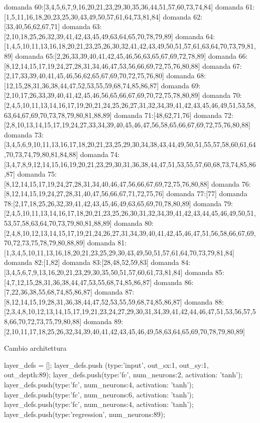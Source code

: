 domanda 60:[3,4,5,6,7,9,16,20,21,23,29,30,35,36,44,51,57,60,73,74,84]
domanda 61:[1,5,11,16,18,20,23,25,30,43,49,50,57,61,64,73,81,84]
domanda 62:[33,40,56,62,67,71]
domanda 63:[2,10,18,25,26,32,39,41,42,43,45,49,63,64,65,70,78,79,89]
domanda 64:[1,4,5,10,11,13,16,18,20,21,23,25,26,30,32,41,42,43,49,50,51,57,61,63,64,70,73,79,81,89]
domanda 65:[2,26,33,39,40,41,42,45,46,56,63,65,67,69,72,78,89]
domanda 66:[8,12,14,15,17,19,24,27,28,31,34,46,47,53,56,66,69,72,75,76,80,88]
domanda 67:[2,17,33,39,40,41,45,46,56,62,65,67,69,70,72,75,76,80]
domanda 68:[12,15,28,31,36,38,44,47,52,53,55,59,68,74,85,86,87]
domanda 69:[2,10,17,26,33,39,40,41,42,45,46,56,65,66,67,69,70,72,75,78,80,89]
domanda 70:[2,4,5,10,11,13,14,16,17,19,20,21,24,25,26,27,31,32,34,39,41,42,43,45,46,49,51,53,58,63,64,67,69,70,73,78,79,80,81,88,89]
domanda 71:[48,62,71,76]
domanda 72:[2,8,10,13,14,15,17,19,24,27,33,34,39,40,45,46,47,56,58,65,66,67,69,72,75,76,80,88]
domanda 73:[3,4,5,6,9,10,11,13,16,17,18,20,21,23,25,29,30,34,38,43,44,49,50,51,55,57,58,60,61,64,70,73,74,79,80,81,84,88]
domanda 74:[3,4,7,8,9,12,14,15,16,19,20,21,23,29,30,31,36,38,44,47,51,53,55,57,60,68,73,74,85,86,87]
domanda 75:[8,12,14,15,17,19,24,27,28,31,34,40,46,47,56,66,67,69,72,75,76,80,88]
domanda 76:[8,12,14,15,19,24,27,28,31,40,47,56,66,67,71,72,75,76]
domanda 77:[77]
domanda 78:[2,17,18,25,26,32,39,41,42,43,45,46,49,63,65,69,70,78,80,89]
domanda 79:[2,4,5,10,11,13,14,16,17,18,20,21,23,25,26,30,31,32,34,39,41,42,43,44,45,46,49,50,51,53,57,58,63,64,70,73,79,80,81,88,89]
domanda 80:[2,4,8,10,12,13,14,15,17,19,21,24,26,27,31,34,39,40,41,42,45,46,47,51,56,58,66,67,69,70,72,73,75,78,79,80,88,89]
domanda 81:[1,3,4,5,10,11,13,16,18,20,21,23,25,29,30,43,49,50,51,57,61,64,70,73,79,81,84]
domanda 82:[1,82]
domanda 83:[28,48,52,59,83]
domanda 84:[3,4,5,6,7,9,13,16,20,21,23,29,30,35,50,51,57,60,61,73,81,84]
domanda 85:[4,7,12,15,28,31,36,38,44,47,53,55,68,74,85,86,87]
domanda 86:[7,22,36,38,55,68,74,85,86,87]
domanda 87:[8,12,14,15,19,28,31,36,38,44,47,52,53,55,59,68,74,85,86,87]
domanda 88:[2,3,4,8,10,12,13,14,15,17,19,21,23,24,27,29,30,31,34,39,41,42,44,46,47,51,53,56,57,58,66,70,72,73,75,79,80,88]
domanda 89:[2,10,11,17,18,25,26,32,34,39,40,41,42,43,45,46,49,58,63,64,65,69,70,78,79,80,89]


Cambio architettura

layer_defs = [];
layer_defs.push
({type:'input', out_sx:1, out_sy:1, out_depth:89});
layer_defs.push({type:'fc', num_neurons:2, activation: 'tanh'});
layer_defs.push({type:'fc', num_neurons:4, activation: 'tanh'});
layer_defs.push({type:'fc', num_neurons:6, activation: 'tanh'});
layer_defs.push({type:'fc', num_neurons:4, activation: 'tanh'});
layer_defs.push({type:'regression', num_neurons:89});

